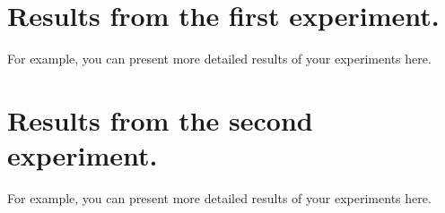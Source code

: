 \documentclass{lutmscthesis}[2017/10/03]
\begin{document}

\appendix
 
\section{Results from the first experiment.}
\label{app:results1}

For example, you can present more detailed results of your experiments here. 

\newpage 

\section{Results from the second experiment.}
\label{app:results2}

For example, you can present more detailed results of your experiments here.
\end{document}
